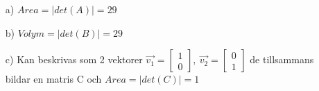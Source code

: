 \begin{itemize}
	\item[a) ] $Area = |det(A)| = 29$
	\item[b) ] $Volym = |det(B)| = 29$
	\item[c) ] Kan beskrivas som 2 vektorer $\vec{v_1}=\begin{bmatrix}1\\0\end{bmatrix},\ \vec{v_2}=\begin{bmatrix}0\\1\end{bmatrix}$ de tillsammans bildar en matris C och $Area = |det(C)| = 1$
\end{itemize}